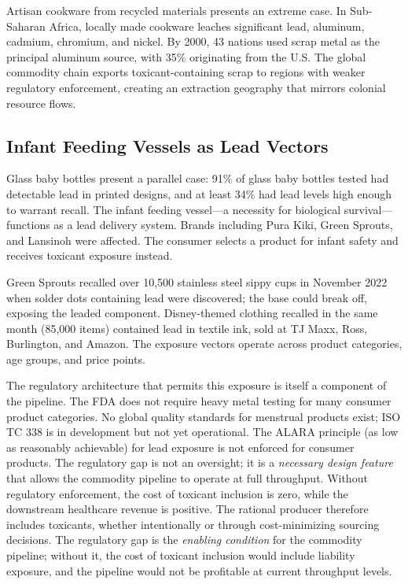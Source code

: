 Artisan cookware from recycled materials presents an extreme case. In Sub-Saharan Africa, locally made cookware leaches significant lead, aluminum, cadmium, chromium, and nickel. By 2000, 43 nations used scrap metal as the principal aluminum source, with 35\% originating from the U.S. The global commodity chain exports toxicant-containing scrap to regions with weaker regulatory enforcement, creating an extraction geography that mirrors colonial resource flows.

\subsection{Infant Feeding Vessels as Lead Vectors}

Glass baby bottles present a parallel case: 91\% of glass baby bottles tested had detectable lead in printed designs, and at least 34\% had lead levels high enough to warrant recall. The infant feeding vessel---a necessity for biological survival---functions as a lead delivery system. Brands including Pura Kiki, Green Sprouts, and Lansinoh were affected. The consumer selects a product for infant safety and receives toxicant exposure instead.

Green Sprouts recalled over 10,500 stainless steel sippy cups in November 2022 when solder dots containing lead were discovered; the base could break off, exposing the leaded component. Disney-themed clothing recalled in the same month (85,000 items) contained lead in textile ink, sold at TJ Maxx, Ross, Burlington, and Amazon. The exposure vectors operate across product categories, age groups, and price points.

The regulatory architecture that permits this exposure is itself a component of the pipeline. The FDA does not require heavy metal testing for many consumer product categories. No global quality standards for menstrual products exist; ISO TC 338 is in development but not yet operational. The ALARA principle (as low as reasonably achievable) for lead exposure is not enforced for consumer products. The regulatory gap is not an oversight; it is a \textit{necessary design feature} that allows the commodity pipeline to operate at full throughput. Without regulatory enforcement, the cost of toxicant inclusion is zero, while the downstream healthcare revenue is positive. The rational producer therefore includes toxicants, whether intentionally or through cost-minimizing sourcing decisions. The regulatory gap is the \textit{enabling condition} for the commodity pipeline; without it, the cost of toxicant inclusion would include liability exposure, and the pipeline would not be profitable at current throughput levels.

